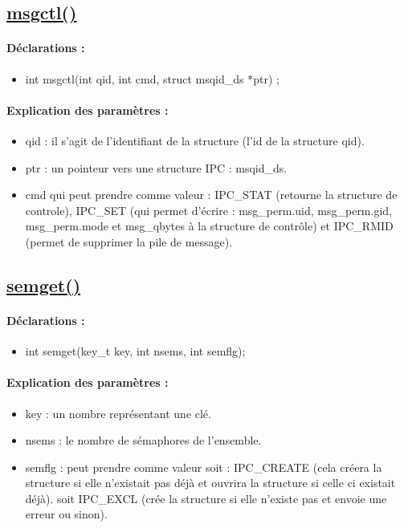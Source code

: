 \documentclass{article}[12pt]
\begin{document}
\subsection{\href{http://jp.barralis.com/linux-man/man2/msgctl.2.php}{msgctl()}}
\paragraph{Déclarations : }
\begin{itemize}
	\item int msgctl(int qid, int cmd, struct msqid\_ds *ptr)	; 
\end{itemize}
\paragraph{Explication des paramètres : }
\begin{itemize}
\item qid : il s'agit de l'identifiant de la structure (l'id de la structure qid). 
\item ptr : un pointeur vers une structure IPC :  msqid\_ds.
\item cmd qui peut prendre comme valeur : IPC\_STAT (retourne la structure de controle), IPC\_SET (qui permet d'écrire : msg\_perm.uid, msg\_perm.gid, msg\_perm.mode et msg\_qbytes à la structure de contrôle) et IPC\_RMID (permet de supprimer la pile de message). 
\end{itemize}
\subsection{\href{http://jp.barralis.com/linux-man/man2/semget.2.php}{semget()}}
\paragraph{Déclarations : }
\begin{itemize}
	\item int semget(key\_t key, int nsems, int semflg);
\end{itemize}
\paragraph{Explication des paramètres : }
\begin{itemize}
\item key : un nombre représentant une clé.
\item nsems : le nombre de sémaphores de l'ensemble. 
\item semflg :  peut prendre comme valeur soit : IPC\_CREATE (cela créera la structure si elle n'existait pas déjà et ouvrira la structure si celle ci existait déjà). soit IPC\_EXCL (crée la structure si elle n'existe pas et envoie une erreur ou sinon).   
\end{itemize}
\end{document}
